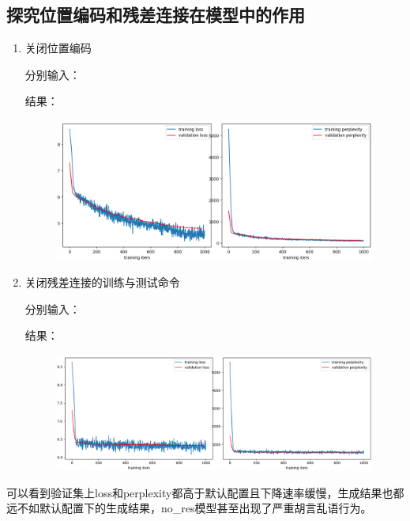 \documentclass[a4paper]{article}
\begin{document}
\subsection{探究位置编码和残差连接在模型中的作用}
\begin{enumerate}
    \item 关闭位置编码
    
    分别输入：
    

    结果：
    \begin{figure}[H]
        \centering
        \includegraphics[width=0.8\linewidth]{../img/2-1.png}
    \end{figure}

    
    
    \item 关闭残差连接的训练与测试命令
    
    分别输入：
    

    结果：
    \begin{figure}[H]
        \centering
        \includegraphics[width=0.8\linewidth]{../img/2-2.png}
    \end{figure}

    
\end{enumerate}

可以看到验证集上loss和perplexity都高于默认配置且下降速率缓慢，生成结果也都远不如默认配置下的生成结果，no\_res模型甚至出现了严重胡言乱语行为。
\end{document}
